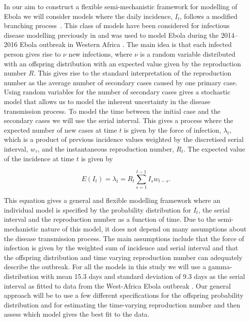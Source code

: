 \documentclass[12pt]{article}
\begin{document}
In our aim to construct a flexible semi-mechanistic framework for modelling of Ebola we will consider models where the daily incidence, $I_t$, follows a modified branching process~\cite{jacobBranchingProcessesTheir2010}. This class of models have been considered for infectious disease modelling previously in \cite{coriNewFrameworkSoftware2013,lloyd-smithSuperspreadingEffectIndividual2005,nouvelletSimpleApproachMeasure2018} and was used to model Ebola during the 2014--2016 Ebola outbreak in Western Africa \cite{whoebolaresponseteamEbolaVirusDisease2014, internationalebolaresponseteamExposurePatternsDriving2016}. The main idea is that each infected person gives rise to $\nu$ new infections, where $\nu$ is a random variable distributed with an offspring distribution with an expected value given by the reproduction number $R$. This gives rise to the standard interpretation of the reproduction number as the average number of secondary cases caused by one primary case. Using random variables for the number of secondary cases gives a stochastic model that allows us to model the inherent uncertainty in the disease transmission process. To model the time between the initial case and the secondary cases we will use the serial interval. This gives a process where the expected number of new cases at time $t$ is given by the force of infection, $\lambda_t$, which is a product of previous incidence values weighted by the discretised serial interval, $w_\tau$, and the instantaneous reproduction number, $R_t$. The expected value of the incidence at time $t$ is given by

\begin{equation}
  E(I_t) = \lambda_t =  R_t \sum^{t-1}_{s=1} I_s w_{t-s}.
  \label{eq:mean_It}
\end{equation}

This equation gives a general and flexible modelling framework where an individual model is specified by the probability distribution for $I_t$, the serial interval and the reproduction number as a function of time. Due to the semi-mechanistic nature of this model, it does not depend on many assumptions about the disease transmission process. The main assumptions include that the force of infection is given by the weighted sum of incidence and serial interval and that the offspring distribution and time varying reproduction number can adequately describe the outbreak. For all the models in this study we will use a gamma-distribution with mean 15.3 days and standard deviation of 9.3 days as the serial interval as fitted to data from the West-Africa Ebola outbreak \cite{whoebolaresponseteamEbolaVirusDisease2014}. Our general approach will be to use a few different specifications for the offspring probability distribution and for estimating the time-varying reproduction number and then assess which model gives the best fit to the data.
\end{document}
